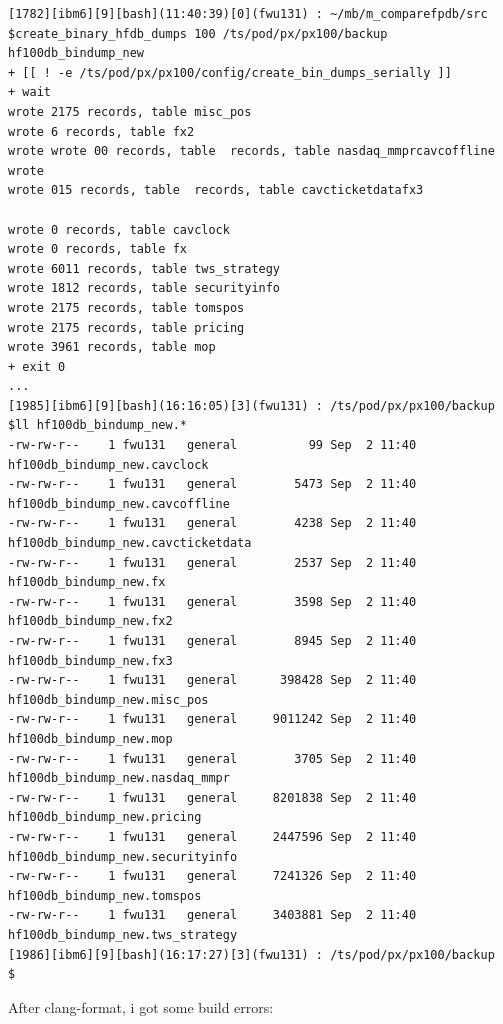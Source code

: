 \documentclass[8pt,]{article}
\begin{document}
\begin{verbatim}
[1782][ibm6][9][bash](11:40:39)[0](fwu131) : ~/mb/m_comparefpdb/src
$create_binary_hfdb_dumps 100 /ts/pod/px/px100/backup hf100db_bindump_new
+ [[ ! -e /ts/pod/px/px100/config/create_bin_dumps_serially ]]
+ wait
wrote 2175 records, table misc_pos
wrote 6 records, table fx2
wrote wrote 00 records, table  records, table nasdaq_mmprcavcoffline
wrote
wrote 015 records, table  records, table cavcticketdatafx3

wrote 0 records, table cavclock
wrote 0 records, table fx
wrote 6011 records, table tws_strategy
wrote 1812 records, table securityinfo
wrote 2175 records, table tomspos
wrote 2175 records, table pricing
wrote 3961 records, table mop
+ exit 0
...
[1985][ibm6][9][bash](16:16:05)[3](fwu131) : /ts/pod/px/px100/backup
$ll hf100db_bindump_new.*
-rw-rw-r--    1 fwu131   general          99 Sep  2 11:40 hf100db_bindump_new.cavclock
-rw-rw-r--    1 fwu131   general        5473 Sep  2 11:40 hf100db_bindump_new.cavcoffline
-rw-rw-r--    1 fwu131   general        4238 Sep  2 11:40 hf100db_bindump_new.cavcticketdata
-rw-rw-r--    1 fwu131   general        2537 Sep  2 11:40 hf100db_bindump_new.fx
-rw-rw-r--    1 fwu131   general        3598 Sep  2 11:40 hf100db_bindump_new.fx2
-rw-rw-r--    1 fwu131   general        8945 Sep  2 11:40 hf100db_bindump_new.fx3
-rw-rw-r--    1 fwu131   general      398428 Sep  2 11:40 hf100db_bindump_new.misc_pos
-rw-rw-r--    1 fwu131   general     9011242 Sep  2 11:40 hf100db_bindump_new.mop
-rw-rw-r--    1 fwu131   general        3705 Sep  2 11:40 hf100db_bindump_new.nasdaq_mmpr
-rw-rw-r--    1 fwu131   general     8201838 Sep  2 11:40 hf100db_bindump_new.pricing
-rw-rw-r--    1 fwu131   general     2447596 Sep  2 11:40 hf100db_bindump_new.securityinfo
-rw-rw-r--    1 fwu131   general     7241326 Sep  2 11:40 hf100db_bindump_new.tomspos
-rw-rw-r--    1 fwu131   general     3403881 Sep  2 11:40 hf100db_bindump_new.tws_strategy
[1986][ibm6][9][bash](16:17:27)[3](fwu131) : /ts/pod/px/px100/backup
$
\end{verbatim}

After clang-format, i got some build errors:
\end{document}
